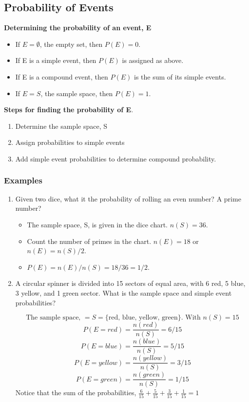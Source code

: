 \documentclass[14pt]{extarticle}
\begin{document}
\subsection{Probability of Events}
\begin{tcolorbox}[enhanced jigsaw,colback=bg,boxrule=0pt,arc=0pt] 
	\textbf{Determining the probability of an event, E}
	\begin{itemize}
		\item If $E=\emptyset$, the empty set, then $P(E)=0$.
		\item If E is a simple event, then $P(E)$ is assigned as above.
		\item If E is a compound event, then $P(E)$ is the sum of its simple events.
		\item If $E=S$, the sample space, then $P(E)=1$.
	\end{itemize}
\end{tcolorbox}

\begin{tcolorbox}[enhanced jigsaw,colback=bg,boxrule=0pt,arc=0pt] 
	\textbf{Steps for finding the probability of E}.
	\begin{enumerate}
		\item Determine the sample space, S
		\item Assign probabilities to simple events
		\item Add simple event probabilities to determine compound probability.
	\end{enumerate}
\end{tcolorbox}

\subsubsection{Examples}
\begin{enumerate}
	\item Given two dice, what it the probability of rolling an even number? A prime number?
	\begin{itemize}
		\item The sample space, S, is given in the dice chart. $n(S)=36$.
		\item Count the number of primes in the chart. $n(E)=18$ or $n(E)=n(S)/2$.
		\item $P(E) = n(E)/n(S)= 18/36 = 1/2$.
	\end{itemize}
	\item A circular spinner is divided into 15 sectors of equal area, with 6 red, 5 blue, 3 yellow, and 1 green sector. What is the sample space and simple event probabilities?

		$$ \text{The sample space, }= S = \text{\{red, blue, yellow, green\}. With } n(S)=15$$
		$$P(E =  red) = \frac{n(red)}{n(S)}= 6/15$$
		$$P(E =  blue) = \frac{n(blue)}{n(S)}= 5/15$$
		$$P(E =  yellow) = \frac{n(yellow)}{n(S)}= 3/15$$
		$$P(E =  green) = \frac{n(green)}{n(S)}= 1/15$$		
	Notice that the sum of the probabilities, $\frac{6}{15}+\frac{5}{15}+\frac{3}{15}+\frac{1}{15} = 1$

\end{enumerate}
\end{document}
